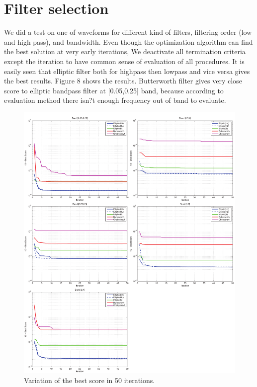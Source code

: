 \documentclass{article}
\begin{document}
\section{Filter selection}
We did a test on one of waveforms for different kind of filters, filtering order (low and high pass), and bandwidth. Even though the optimization algorithm can find the best solution at very early iterations, We deactivate all termination criteria except the iteration to have  common sense of evaluation of all procedures. It is easily seen that elliptic filter both for highpass then lowpass and vice versa gives the best results. Figure 8 shows the results. Butterworth filter gives very close score to elliptic bandpass filter at [0.05,0.25] band, because according to evaluation method there isn?t enough frequency out of band to evaluate. 


\begin{figure} [H]
\begin{center}  
\includegraphics[scale=0.6]{figures/pdf/figure9.pdf} 
\caption{Variation of the best score in 50 iterations.}
\end{center}   
\end{figure}




\newpage


{
\renewcommand{\bibname}{}


}
\end{document}
